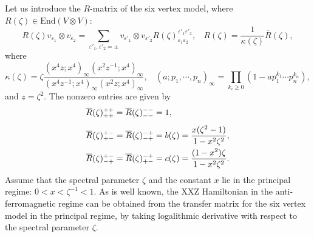 \documentclass[a4paper,10pt]{article}
\begin{document}
Let us introduce the $R$-matrix of the six vertex 
model, where $R(\zeta) \in \mbox{End}(V \otimes V)$: 
\begin{equation}
R(\zeta)v_{\varepsilon_1}\otimes v_{\varepsilon_2}=
\sum_{\varepsilon'_1,\varepsilon'_2 =\pm} 
v_{\varepsilon'_1}\otimes v_{\varepsilon'_2}
R(\zeta)_{\varepsilon_1 \varepsilon_2}
    ^{\varepsilon'_1 \varepsilon'_2}, ~~~~
    R(\zeta)=\frac{1}{\kappa (\zeta )} 
    \overline{R}(\zeta), 
\label{eq:R-comp}
\end{equation}
where 
\begin{equation}
\kappa (\zeta)=\zeta
\frac{(x^4 z;x^4)_{\infty}(x^2 z^{-1};x^4)_{\infty}}
{(x^4 z^{-1};x^4)_{\infty}(x^2 z;x^4)_{\infty}}, 
~~~~
(a;p_1,\cdots,p_n)_\infty=
\prod_{k_i\ge 0}(1-ap_1^{k_1}\cdots p_n^{k_n}), 
\label{eq:kappa}
\end{equation}
and $z=\zeta^2$. The nonzero entries are given by 
\begin{equation}
\begin{array}{l}
\overline{R}(\zeta)^{++}_{++}
=\overline{R}(\zeta)^{--}_{--}=1,\\[3mm]
\displaystyle\overline{R}(\zeta)^{+-}_{+-}
=\overline{R}(\zeta)^{-+}_{-+}=b(\zeta) 
={x(\zeta^2 -1)\over 1-x^2\zeta^2},\\[3mm]
\displaystyle \overline{R}(\zeta)^{+-}_{-+}
=\overline{R}(\zeta)^{-+}_{+-}=c(\zeta)
={(1-x^2)\zeta \over 1-x^2 \zeta^2 }. 
\end{array}
\label{eq:b,c}
\end{equation}
Assume that the spectral parameter $\zeta$ and the 
constant $x$ lie in the principal regime: 
$0<x<\zeta^{-1}<1$. 
As is well known, the XXZ Hamiltonian in the 
anti-ferromagnetic regime can be obtained from the 
transfer matrix for the six vertex model in the principal 
regime, by taking logalithmic derivative with respect 
to the spectral parameter $\zeta$. 
\end{document}
